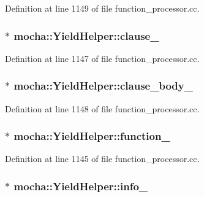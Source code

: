 Definition at line 1149 of file function\_\-processor.cc.

\hypertarget{classmocha_1_1_yield_helper_a9247061d7e154c260d9ded8353721a65}{
\subsubsection[{clause\_\-}]{$\ast$ {\bf mocha::YieldHelper::clause\_\-}}}
\label{classmocha_1_1_yield_helper_a9247061d7e154c260d9ded8353721a65}


Definition at line 1147 of file function\_\-processor.cc.

\hypertarget{classmocha_1_1_yield_helper_a046274df2eacd4e17ad512cd6326b33a}{
\subsubsection[{clause\_\-body\_\-}]{$\ast$ {\bf mocha::YieldHelper::clause\_\-body\_\-}}}
\label{classmocha_1_1_yield_helper_a046274df2eacd4e17ad512cd6326b33a}


Definition at line 1148 of file function\_\-processor.cc.

\hypertarget{classmocha_1_1_yield_helper_a9e99c357f655aabff5f38121dfb08d18}{
\subsubsection[{function\_\-}]{$\ast$ {\bf mocha::YieldHelper::function\_\-}}}
\label{classmocha_1_1_yield_helper_a9e99c357f655aabff5f38121dfb08d18}


Definition at line 1145 of file function\_\-processor.cc.

\hypertarget{classmocha_1_1_yield_helper_ac8e17b43697ddf37d4b013f517d37e0d}{
\subsubsection[{info\_\-}]{$\ast$ {\bf mocha::YieldHelper::info\_\-}}}
\label{classmocha_1_1_yield_helper_ac8e17b43697ddf37d4b013f517d37e0d}


